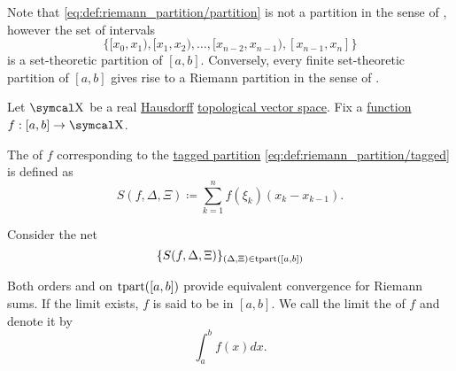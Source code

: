 \begin{remark}\label{rem:set_and_riemann_partitions}
  Note that \eqref{eq:def:riemann_partition/partition} is not a partition in the sense of , however the set of intervals
  \begin{equation*}
    \Big\{ [x_0, x_1), [x_1, x_2), \ldots, [x_{n-2}, x_{n-1}), [x_{n-1}, x_n] \Big\}
  \end{equation*}
  is a set-theoretic partition of \( [a, b] \). Conversely, every finite set-theoretic partition of \( [a, b] \) gives rise to a Riemann partition in the sense of .
\end{remark}

\begin{definition}\label{def:riemann_integral}
  Let \( \CX \) be a real \hyperref[def:separation_axioms/T2]{Hausdorff} \hyperref[def:topological_vector_space]{topological vector space}. Fix a \hyperref[def:function/single_valued]{function} \( f: [a, b] \to \CX \).

  The  of \( f \) corresponding to the \hyperref[def:riemann_partition/tagged]{tagged partition} \eqref{eq:def:riemann_partition/tagged} is defined as
  \begin{equation*}
    S(f, \Delta, \Xi) \coloneqq \sum_{k=1}^n f(\xi_k) (x_k - x_{k-1}).
  \end{equation*}

  Consider the net
  \begin{equation}\label{eq:def:riemann_integral/net}
    \{ S(f, \Delta, \Xi) \}_{(\Delta, \Xi) \in \operatorname{tpart}([a, b])}
  \end{equation}

  Both orders  and  on \( \operatorname{tpart}([a, b]) \) provide equivalent convergence for Riemann sums. If the limit exists, \( f \) is said to be  in \( [a, b] \). We call the limit the  of \( f \) and denote it by
  \begin{equation}\label{eq:def:riemann_integral}
    \int_a^b f(x) dx.
  \end{equation}
\end{definition}
